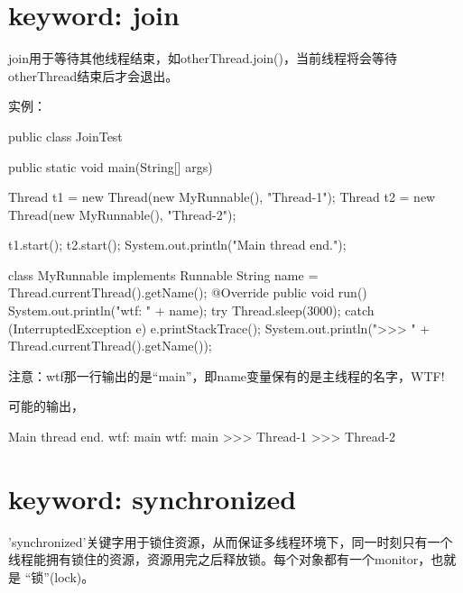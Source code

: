 ﻿\section[keyword: join]{keyword: join}
join用于等待其他线程结束，如otherThread.join()，当前线程将会等待
otherThread结束后才会退出。

实例：

\begin{javacode}
public class JoinTest {
  public static void main(String[] args) {
    Thread t1 = new Thread(new MyRunnable(), "Thread-1");
    Thread t2 = new Thread(new MyRunnable(), "Thread-2");

    t1.start();
    t2.start();
    System.out.println("Main thread end.");
  }
}

class MyRunnable implements Runnable {
  String name = Thread.currentThread().getName();
  @Override
  public void run() {
    System.out.println("wtf: " + name);
    try {
      Thread.sleep(3000);
    } catch (InterruptedException e) {
      e.printStackTrace();
    }
    System.out.println(">>> " + Thread.currentThread().getName());
  }
}
\end{javacode}

注意：wtf那一行输出的是“main”，即name变量保有的是主线程的名字，WTF!

可能的输出，

\begin{bashcode}
Main thread end.
wtf: main
wtf: main
>>> Thread-1
>>> Thread-2
\end{bashcode}

\section[keyword: synchronized]{keyword: synchronized}
'synchronized'关键字用于锁住资源，从而保证多线程环境下，同一时刻只有一个
线程能拥有锁住的资源，资源用完之后释放锁。每个对象都有一个monitor，也就是
“锁”(lock)。

